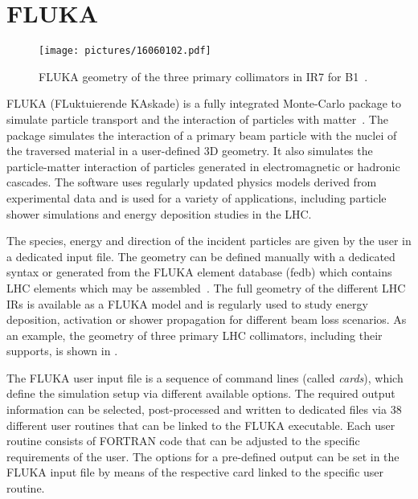 
\section{FLUKA}


\begin{figure}[t]  
    \centering
    \texttt{[image: pictures/16060102.pdf]}
    \caption{FLUKA geometry of the three primary collimators in IR7 for B1~\cite{skordis_fluka_model}.}  
    \label{pic:16031201}
\end{figure}


FLUKA (FLuktuierende KAskade) is a fully integrated Monte-Carlo package to simulate particle transport and the interaction of particles with matter~\cite{ferrari2005fluka,bohlen2014fluka}. The package simulates the interaction of a primary beam particle with the nuclei of the traversed material in a user-defined 3D geometry. It also simulates the particle-matter interaction of particles generated in electromagnetic or hadronic cascades. The software uses regularly updated physics models derived from experimental data and is used for a variety of applications, including particle shower simulations and energy deposition studies in the LHC. 

The species, energy and direction of the incident particles are given by the user in a dedicated input file. The geometry can be defined manually with a dedicated syntax or generated from the FLUKA element database (fedb) which contains LHC elements which may be assembled~\cite{WEPPD071}. The full geometry of the different LHC IRs is available as a FLUKA model and is regularly used to study energy deposition, activation or shower propagation for different beam loss scenarios. As an example, the geometry of three primary LHC collimators, including their supports, is shown in .

The FLUKA user input file is a sequence of command lines (called \textit{cards}), which define the simulation setup via different available options. The required output information can be selected, post-processed and written to dedicated files via 38 different user routines that can be linked to the FLUKA executable. Each user routine consists of FORTRAN code that can be adjusted to the specific requirements of the user. The options for a pre-defined output can be set in the FLUKA input file by means of the respective card linked to the specific user routine. 


